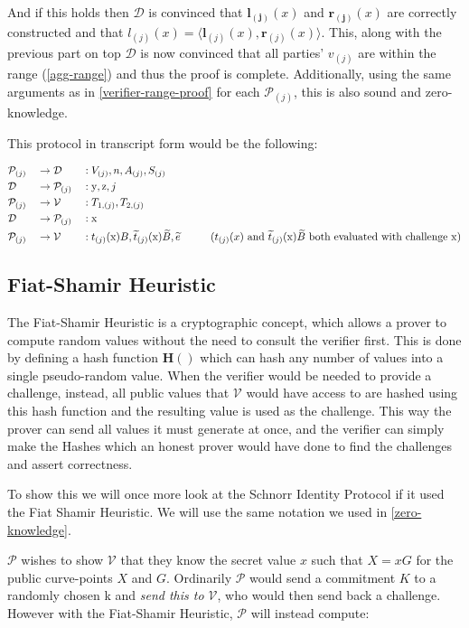 \documentclass{article}
\newcommand{\eq}[1]{\begin{alignat*}{20}#1\end{alignat*}}
\renewcommand{\vec}[1]{\boldsymbol{#1}}
\newcommand{\ran}[1]{\mathrm{#1}}
\newcommand{\V}{\mathcal{V}}
\renewcommand{\P}{\mathcal{P}}
\newcommand{\D}{\mathcal{D}}
\newcommand{\dotp}[2]{\langle #1, #2 \rangle}
\newcommand{\tB}{\widetilde{B}}
\renewcommand{\tt}{\widetilde{t}}
\begin{document}
And if this holds then $\D$ is convinced that $\vec{l_{(j)}}(x)$
and $\vec{r_{(j)}}(x)$ are correctly constructed and that $l_{(j)}(x) = \dotp{\vec{l}_{(j)}(x)}{\vec{r}_{(j)}(x)}$. This, along with the previous
part on top $\D$ is now convinced that all parties' $v_{(j)}$ are within
the range (\ref{agg-range}) and thus the proof is complete. Additionally,
using the same arguments as in \ref{verifier-range-proof} for each
$\P_{(j)}$, this is also sound and zero-knowledge.

This protocol in transcript form would be the following: 

\eq{
	&\P_{(j)} &&\rightarrow \D &&: V_{(j)}, n, A_{(j)}, S_{(j)} \\
	&\D &&\rightarrow \P_{(j)} &&: \ran{y}, \ran{z}, j \\
	&\P_{(j)} &&\rightarrow \V &&: T_{1, (j)}, T_{2,(j)} \\
	&\D &&\rightarrow \P_{(j)} &&: \ran{x} \\
	&\P_{(j)} &&\rightarrow \V &&: t_{(j)}(\ran{x})B, \tt_{(j)}(\ran{x})\tB, \widetilde{e} \hspace*{1cm}\text{($t_{(j)}(x)$ and $\tt_{(j)}(\ran{x})\tB$ both evaluated with challenge $\ran{x}$)}\\
}


\subsection{Fiat-Shamir Heuristic}\label{fiat-shamir-heuristic}

The Fiat-Shamir Heuristic is a cryptographic concept, which allows a
prover to compute random values without the need to consult the verifier
first. This is done by defining a hash function $\textbf{H}()$ which
can hash any number of values into a single pseudo-random value. When
the verifier would be needed to provide a challenge, instead, all
public values that $\V$ would have access to are hashed using this
hash function and the resulting value is used as the challenge. This
way the prover can send all values it must generate at once, and the
verifier can simply make the Hashes which an honest prover would have
done to find the challenges and assert correctness.

To show this we will once more look at the Schnorr Identity Protocol
if it used the Fiat Shamir Heuristic. We will use the same notation
we used in \ref{zero-knowledge}.

$\P$ wishes to show $\V$ that they know the secret value $x$ such that
$X = xG$ for the public curve-points $X$ and $G$. Ordinarily $\P$
would send a commitment $K$ to a randomly chosen k and \textit{send
this to $\V$}, who would then send back a challenge. However with the
Fiat-Shamir Heuristic, $\P$ will instead compute:
\end{document}

